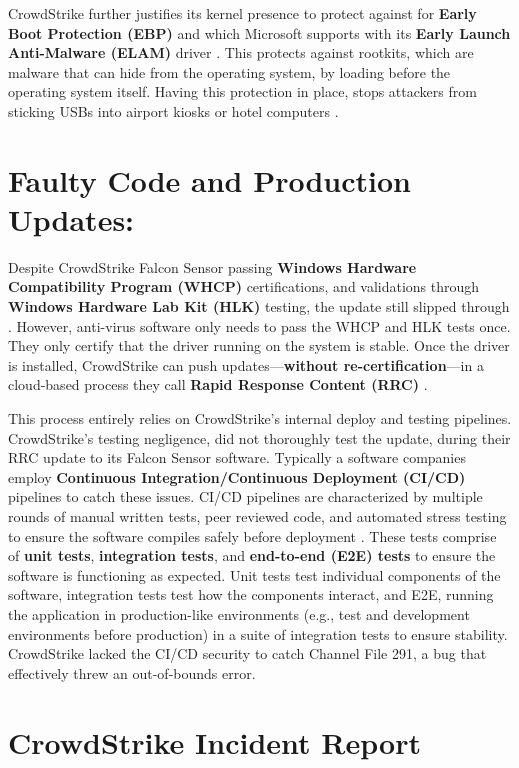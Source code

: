 CrowdStrike further justifies its kernel presence to protect against for \textbf{Early Boot Protection (EBP)} and which
Microsoft supports with its \textbf{Early Launch Anti-Malware (ELAM)} driver \cite{ionescu_kernel_access_2024}. This protects against rootkits, which are
malware that can hide from the operating system, by loading before the operating system itself. Having this
protection in place, stops attackers from sticking USBs into airport kiosks or hotel computers \cite{baker_rootkits_2023}.

\section{Faulty Code and Production Updates:}

Despite CrowdStrike Falcon Sensor passing \textbf{Windows Hardware Compatibility Program (WHCP)} certifications, and
validations through \textbf{Windows Hardware Lab Kit (HLK)} testing, the update still slipped through \cite{microsoftwhcpcertification}.
However, anti-virus software only needs to pass the WHCP and HLK tests once. They only certify that the driver running on the system
is stable. Once the driver is installed, CrowdStrike can push updates---\textbf{without re-certification}---in a cloud-based process they call
\textbf{Rapid Response Content (RRC)} \cite{crowdstrikechannelfile291rca}.

This process entirely relies on CrowdStrike's internal deploy and testing pipelines. CrowdStrike's testing negligence, did not thoroughly test the update,
during their RRC update to its Falcon Sensor software. Typically a software companies employ \textbf{Continuous Integration/Continuous Deployment (CI/CD)} pipelines
to catch these issues. CI/CD pipelines are characterized by multiple rounds of manual written tests, peer reviewed code, and automated stress testing to ensure the software compiles safely before deployment \cite{redhat_cicd_2023}.
These tests comprise of \textbf{unit tests}, \textbf{integration tests}, and \textbf{end-to-end (E2E) tests} to ensure the software is functioning as expected.
Unit tests test individual components of the software, integration tests test how the components interact, and E2E, running the application in production-like environments (e.g., test and development environments before production) in
a suite of integration tests to ensure stability. CrowdStrike lacked the CI/CD security to catch Channel File 291, a bug that effectively threw an out-of-bounds error.

\section{CrowdStrike Incident Report}

